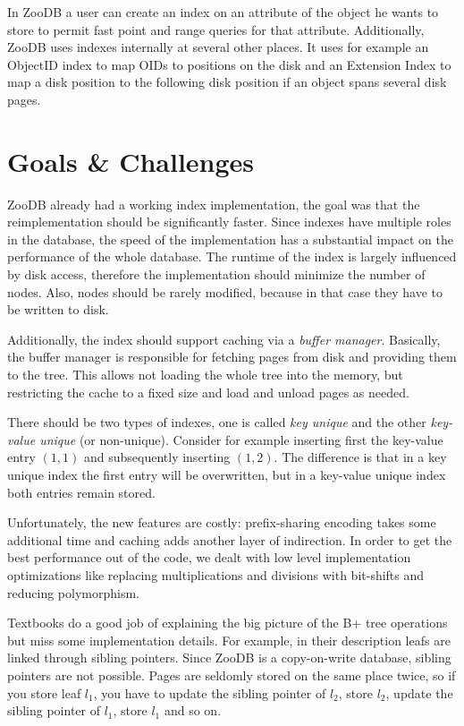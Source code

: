 \documentclass[11pt,a4paper,oneside]{article}
\begin{document}
In ZooDB a user can create an index on an attribute of the object he wants to store to permit fast point and range queries for that attribute.
Additionally, ZooDB uses indexes internally at several other places.
It uses for example an ObjectID index to map OIDs to positions on the disk and an Extension Index to map a disk position to the following disk position if an object spans several disk pages. 

\section{Goals \& Challenges}
ZooDB already had a working index implementation, the goal was that the reimplementation should be significantly faster. 
Since indexes have multiple roles in the database, the speed of the implementation has a substantial impact on the performance of the whole database.
The runtime of the index is largely influenced by disk access, therefore the implementation should minimize the number of nodes.
Also, nodes should be rarely modified, because in that case they have to be written to disk.

Additionally, the index should support caching via a \emph{buffer manager}. 
Basically, the buffer manager is responsible for fetching pages from disk and providing them to the tree.
This allows not loading the whole tree into the memory, but restricting the cache to a fixed size and load and unload pages as needed.

There should be two types of indexes, one is called \emph{key unique} and the other \emph{key-value unique} (or non-unique). 
Consider for example inserting first the key-value entry $(1,1)$ and subsequently inserting $(1,2)$.
The difference is that in a key unique index the first entry will be overwritten, but in a key-value unique index both entries remain stored. 

Unfortunately, the new features are costly: prefix-sharing encoding takes some additional time and caching adds another layer of indirection.
In order to get the best performance out of the code, we dealt with low level implementation optimizations like replacing multiplications and divisions with bit-shifts and reducing polymorphism.

Textbooks do a good job of explaining the big picture of the B+ tree operations but miss some implementation details.
For example, in their description leafs are linked through sibling pointers. Since ZooDB is a copy-on-write database, sibling pointers are not possible.
Pages are seldomly stored on the same place twice, so if you store leaf $l_1$, you have to update the sibling pointer of $l_2$, store $l_2$, update the sibling pointer of $l_1$, store $l_1$ and so on.
\end{document}
